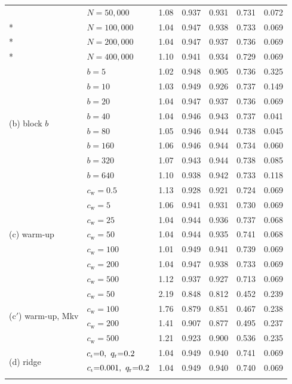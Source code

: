 \begin{longtable}{llrrrrr}
 & $N=50{,}000$ & 1.08 & 0.937 & 0.931 & 0.731 & 0.072 \\*
 & $N=100{,}000$ & 1.04 & 0.947 & 0.938 & 0.733 & 0.069 \\*
 & $N=200{,}000$ & 1.04 & 0.947 & 0.937 & 0.736 & 0.069 \\*
 & $N=400{,}000$ & 1.10 & 0.941 & 0.934 & 0.729 & 0.069 \\
\midrule
\multirow{8}{*}{(b) block $b$} & $b=5$ & 1.02 & 0.948 & 0.905 & 0.736 & 0.325 \\*
 & $b=10$ & 1.03 & 0.949 & 0.926 & 0.737 & 0.149 \\*
 & $b=20$ & 1.04 & 0.947 & 0.937 & 0.736 & 0.069 \\*
 & $b=40$ & 1.04 & 0.946 & 0.943 & 0.737 & 0.041 \\*
 & $b=80$ & 1.05 & 0.946 & 0.944 & 0.738 & 0.045 \\*
 & $b=160$ & 1.06 & 0.946 & 0.944 & 0.734 & 0.060 \\*
 & $b=320$ & 1.07 & 0.943 & 0.944 & 0.738 & 0.085 \\*
 & $b=640$ & 1.10 & 0.938 & 0.942 & 0.733 & 0.118 \\
\midrule
\multirow{7}{*}{(c) warm-up} & $c_{\mathrm w}=0.5$ & 1.13 & 0.928 & 0.921 & 0.724 & 0.069 \\*
 & $c_{\mathrm w}=5$ & 1.06 & 0.941 & 0.931 & 0.730 & 0.069 \\*
 & $c_{\mathrm w}=25$ & 1.04 & 0.944 & 0.936 & 0.737 & 0.068 \\*
 & $c_{\mathrm w}=50$ & 1.04 & 0.944 & 0.935 & 0.741 & 0.068 \\*
 & $c_{\mathrm w}=100$ & 1.01 & 0.949 & 0.941 & 0.739 & 0.069 \\*
 & $c_{\mathrm w}=200$ & 1.04 & 0.947 & 0.938 & 0.733 & 0.069 \\*
 & $c_{\mathrm w}=500$ & 1.12 & 0.937 & 0.927 & 0.713 & 0.069 \\
\midrule
\multirow{4}{*}{(c$'$) warm-up, Mkv} & $c_{\mathrm w}=50$ & 2.19 & 0.848 & 0.812 & 0.452 & 0.239 \\*
 & $c_{\mathrm w}=100$ & 1.76 & 0.879 & 0.851 & 0.467 & 0.238 \\*
 & $c_{\mathrm w}=200$ & 1.41 & 0.907 & 0.877 & 0.495 & 0.237 \\*
 & $c_{\mathrm w}=500$ & 1.21 & 0.923 & 0.900 & 0.536 & 0.235 \\
\midrule
\multirow{10}{*}{(d) ridge} & $c_\iota{=}0,\ \qr{=}0.2$ & 1.04 & 0.949 & 0.940 & 0.741 & 0.069 \\*
 & $c_\iota{=}0.001,\ q_{\mathrm r}{=}0.2$ & 1.04 & 0.949 & 0.940 & 0.740 & 0.069 \\*

\end{longtable}
